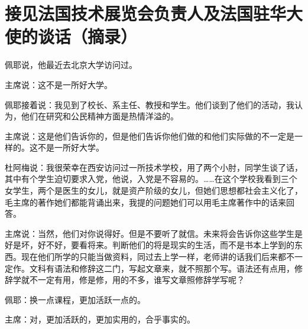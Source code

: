 \section[接见法国技术展览会负责人及法国驻华大使的谈话（摘录）（一九六四年九月十日）]{接见法国技术展览会负责人及法国驻华大使的谈话（摘录）}


佩耶说，他最近去北京大学访问过。

主席说：这不是一所好大学。

佩耶接着说：我见到了校长、系主任、教授和学生。他们谈到了他们的活动，我认为，他们在研究和公民精神方面是热情洋溢的。

主席说：这是他们告诉你的，但是他们告诉你他们做的和他们实际做的不一定是一样的。这不是一所好大学。

杜阿梅说：我很荣幸在西安访问过一所技术学校，用了两个小肘，同学生谈了话，其中有个学生迫切要求入党，他说，入党是不容易的。……在这个学校我看到三个女学生，两个是医生的女儿，就是资产阶级的女儿，但她们思想都社会主义化了，毛主席的著作她们都能背诵出来，我提的问题她们可以用毛主席著作中的话来回答。

主席说：当然，他们对你说得好。但是不要听了就信。未来将会告诉你这些学生是好是坏，好不好，要看将来。判断他们的将是现实的生活，而不是书本上学到的东西。现在他们所学的只能当做资料，同过去上学一样，老师讲的话我们后来都不一定作。文科有语法和修辞这二门，写起文章来，就不照那个写。语法还有点用，修辞学就不一定有用，修是修，用的不多，谁写文章照修辞学写呢？

佩耶：换一点课程，更加活跃一点的。

主席：对，更加活跃的，更加实用的，合乎事实的。


